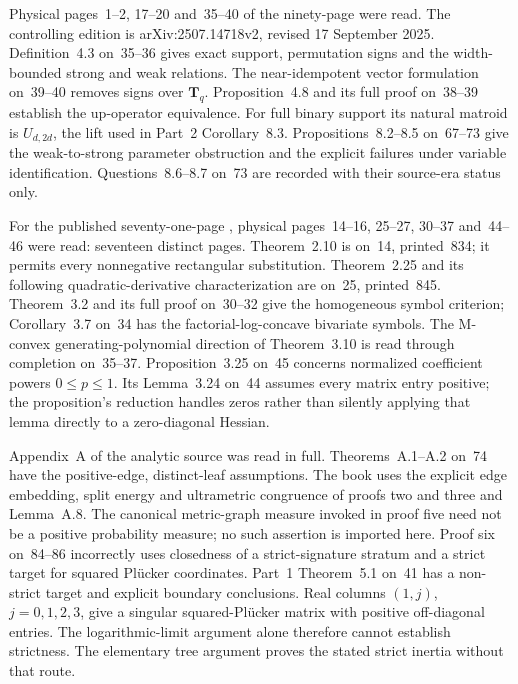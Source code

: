 Physical pages~1--2, 17--20 and~35--40 of the ninety-page
\cite{BakerHuhKimKummerLorscheid25PolymatroidsV2} were read.
The controlling edition is arXiv:2507.14718v2,
revised 17 September 2025.
Definition~4.3 on~35--36 gives exact support, permutation
signs and the width-bounded strong and weak relations.
The near-idempotent vector formulation on~39--40 removes
signs over $\mathbf T_q$. Proposition~4.8 and its full
proof on~38--39 establish the up-operator equivalence.
For full binary support its natural matroid is
$U_{d,2d}$, the lift used in Part~2 Corollary~8.3.
Propositions~8.2--8.5 on~67--73 give the weak-to-strong
parameter obstruction and the explicit failures under
variable identification. Questions~8.6--8.7 on~73 are
recorded with their source-era status only.

For the published seventy-one-page
\cite{BrandenHuh20Lorentzian}, physical pages~14--16,
25--27, 30--37 and~44--46 were read: seventeen distinct
pages. Theorem~2.10 is on~14, printed~834; it permits
every nonnegative rectangular substitution. Theorem~2.25
and its following quadratic-derivative characterization
are on~25, printed~845. Theorem~3.2 and its full proof
on~30--32 give the homogeneous symbol criterion;
Corollary~3.7 on~34 has the factorial-log-concave
bivariate symbols. The M-convex generating-polynomial
direction of Theorem~3.10 is read through completion
on~35--37. Proposition~3.25 on~45 concerns normalized
coefficient powers $0\leq p\leq1$. Its Lemma~3.24 on~44
assumes every matrix entry positive; the proposition's
reduction handles zeros rather than silently applying
that lemma directly to a zero-diagonal Hessian.

Appendix~A of the analytic source was read in full.
Theorems~A.1--A.2 on~74 have the positive-edge,
distinct-leaf assumptions. The book uses the explicit
edge embedding, split energy and ultrametric congruence
of proofs two and three and Lemma~A.8. The canonical
metric-graph measure invoked in proof five need not be
a positive probability measure; no such assertion is
imported here. Proof six on~84--86 incorrectly uses
closedness of a strict-signature stratum and a strict
target for squared Pl\"ucker coordinates. Part~1
Theorem~5.1 on~41 has a non-strict target and explicit
boundary conclusions. Real columns $(1,j)$,
$j=0,1,2,3$, give a singular squared-Pl\"ucker matrix
with positive off-diagonal entries. The logarithmic-limit
argument alone therefore cannot establish strictness.
The elementary tree argument proves the stated strict
inertia without that route.

